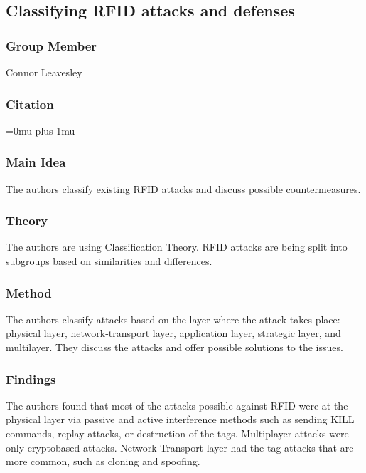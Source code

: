 \noindent
\subsection{Classifying RFID attacks and defenses}

\subsubsection{Group Member}

\noindent
Connor Leavesley

\noindent
\subsubsection{Citation}

\Urlmuskip=0mu plus 1mu\relax

\subsubsection{Main Idea}

\noindent
The authors classify existing RFID attacks and discuss possible countermeasures.

\subsubsection{Theory}

\noindent
The authors are using Classification Theory. RFID attacks are being split into subgroups based on similarities and differences. 

\subsubsection{Method}

\noindent
The authors classify attacks based on the layer where the attack takes place: physical layer, network-transport layer, application layer, strategic layer, and multilayer. They discuss the attacks and offer possible solutions to the issues. 

\subsubsection{Findings}

\noindent
The authors found that most of the attacks possible against RFID were at the physical layer via passive and active interference methods such as sending KILL commands, replay attacks, or destruction of the tags. Multiplayer attacks were only cryptobased attacks. Network-Transport layer had the tag attacks that are more common, such as cloning and spoofing. 

